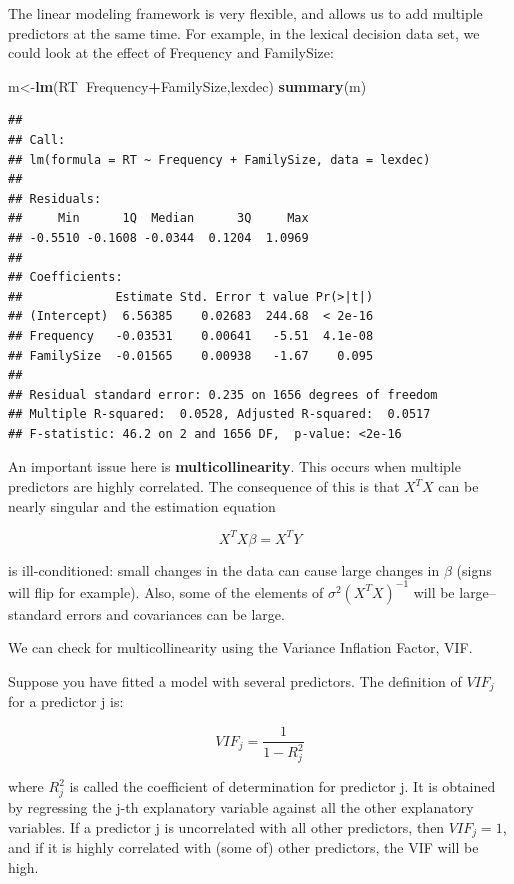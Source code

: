 \documentclass[12pt,]{krantz}
\newenvironment{Shaded}{\begin{snugshade}}{\end{snugshade}}
\newcommand{\KeywordTok}[1]{\textcolor[rgb]{0.13,0.29,0.53}{\textbf{#1}}}
\newcommand{\NormalTok}[1]{#1}
\newcommand{\OperatorTok}[1]{\textcolor[rgb]{0.81,0.36,0.00}{\textbf{#1}}}
\begin{document}
The linear modeling framework is very flexible, and allows us to add multiple predictors at the same time. For example, in the lexical decision data set, we could look at the effect of Frequency and FamilySize:

\begin{Shaded}
\begin{Highlighting}[]
\NormalTok{m<-}\KeywordTok{lm}\NormalTok{(RT}\OperatorTok{~}\NormalTok{Frequency}\OperatorTok{+}\NormalTok{FamilySize,lexdec)}
\KeywordTok{summary}\NormalTok{(m)}
\end{Highlighting}
\end{Shaded}

\begin{verbatim}
## 
## Call:
## lm(formula = RT ~ Frequency + FamilySize, data = lexdec)
## 
## Residuals:
##     Min      1Q  Median      3Q     Max 
## -0.5510 -0.1608 -0.0344  0.1204  1.0969 
## 
## Coefficients:
##             Estimate Std. Error t value Pr(>|t|)
## (Intercept)  6.56385    0.02683  244.68  < 2e-16
## Frequency   -0.03531    0.00641   -5.51  4.1e-08
## FamilySize  -0.01565    0.00938   -1.67    0.095
## 
## Residual standard error: 0.235 on 1656 degrees of freedom
## Multiple R-squared:  0.0528, Adjusted R-squared:  0.0517 
## F-statistic: 46.2 on 2 and 1656 DF,  p-value: <2e-16
\end{verbatim}

An important issue here is \textbf{multicollinearity}. This occurs when multiple predictors are highly correlated. The consequence of this is that \(X^T X\) can be nearly singular and the estimation equation

\begin{equation}
X^TX \beta = X^T Y 
\end{equation}

is ill-conditioned: small changes in the data can cause large changes in \(\beta\) (signs will flip for example). Also, some of the elements of \(\sigma^2 (X^TX)^{-1}\) will be large--standard errors and covariances can be large.

We can check for multicollinearity using the Variance Inflation Factor, VIF.

Suppose you have fitted a model with several predictors.
The definition of \(VIF_j\) for a predictor j is:

\begin{equation}
VIF_j = \frac{1}{1-R_j^2}
\end{equation}

where \(R_j^2\) is called the coefficient of determination for predictor j.
It is obtained by regressing the j-th explanatory variable against all the
other explanatory variables.
If a predictor j is uncorrelated with all other predictors, then \(VIF_j=1\), and
if it is highly correlated with (some of) other predictors, the VIF will be high.
\end{document}
